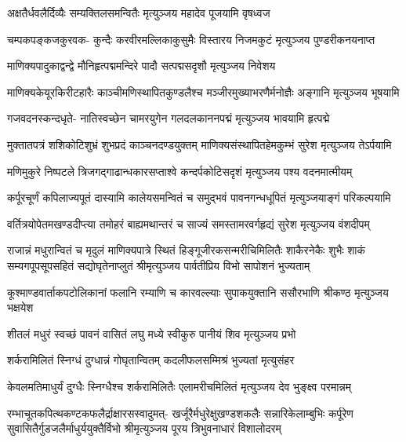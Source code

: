 \twolineshloka
{अक्षतैर्धवलैर्दिव्यैः सम्यक्तिलसमन्वितैः}
{मृत्युञ्जय महादेव पूजयामि वृषध्वज}%

\fourlineindentedshloka
{चम्पकपङ्कजकुरवक-}
{कुन्दैः करवीरमल्लिकाकुसुमैः}
{विस्तारय निजमकुटं}
{मृत्युञ्जय पुण्डरीकनयनाप्त}%

\twolineshloka
{माणिक्यपादुकाद्वन्द्वे मौनिहृत्पद्ममन्दिरे}
{पादौ सत्पद्मसदृशौ मृत्युञ्जय निवेशय}%

\fourlineindentedshloka
{माणिक्यकेयूरकिरीटहारैः}
{काञ्चीमणिस्थापितकुण्डलैश्च}
{मञ्जीरमुख्याभरणैर्मनोज्ञैः}
{अङ्गानि मृत्युञ्जय भूषयामि}%

\fourlineindentedshloka
{गजवदनस्कन्दधृते-}
{नातिस्वच्छेन चामरयुगेन}
{गलदलकाननपद्मं}
{मृत्युञ्जय भावयामि हृत्पद्मे}%

\fourlineindentedshloka
{मुक्तातपत्रं शशिकोटिशुभ्रं}
{शुभप्रदं काञ्चनदण्डयुक्तम्}
{माणिक्यसंस्थापितहेमकुम्भं}
{सुरेश मृत्युञ्जय तेऽर्पयामि}%

\fourlineindentedshloka
{मणिमुकुरे निष्पटले}
{त्रिजगद्गाढान्धकारसप्ताश्वे}
{कन्दर्पकोटिसदृशं}
{मृत्युञ्जय पश्य वदनमात्मीयम्}%

\fourlineindentedshloka
{कर्पूरचूर्णं कपिलाज्यपूतं}
{दास्यामि कालेयसमन्वितं च}
{समुद्भवं पावनगन्धधूपितं}
{मृत्युञ्जयाङ्गं परिकल्पयामि}%

\fourlineindentedshloka
{वर्तित्रयोपेतमखण्डदीप्त्या}
{तमोहरं बाह्यमथान्तरं च}
{साज्यं समस्तामरवर्गहृद्यं}
{सुरेश मृत्युञ्जय वंशदीपम्}%

\fourlineindentedshloka
{राजान्नं मधुरान्वितं च मृदुलं माणिक्यपात्रे स्थितं}
{हिङ्गूजीरकसन्मरीचिमिलितैः शाकैरनेकैः शुभैः}
{शाकं सम्यगपूपसूपसहितं सद्योघृतेनाप्लुतं}
{श्रीमृत्युञ्जय पार्वतीप्रिय विभो सापोशनं भुज्यताम्}%

\fourlineindentedshloka
{कूश्माण्डवार्ताकपटोलिकानां}
{फलानि रम्याणि च कारवल्ल्याः}
{सुपाकयुक्तानि ससौरभाणि}
{श्रीकण्ठ मृत्युञ्जय भक्षयेश}%

\twolineshloka
{शीतलं मधुरं स्वच्छं पावनं वासितं लघु}
{मध्ये स्वीकुरु पानीयं शिव मृत्युञ्जय प्रभो}%

\twolineshloka
{शर्करामिलितं स्निग्धं दुग्धान्नं गोघृतान्वितम्}
{कदलीफलसम्मिश्रं भुज्यतां मृत्युसंहर}%

\fourlineindentedshloka
{केवलमतिमाधुर्यं}
{दुग्धैः स्निग्धैश्च शर्करामिलितैः}
{एलामरीचमिलितं}
{मृत्युञ्जय देव भुङ्क्ष्व परमान्नम्}%

\fourlineindentedshloka
{रम्भाचूतकपित्थकण्टकफलैर्द्राक्षारसस्वादुमत्-}
{खर्जूरैर्मधुरेक्षुखण्डशकलैः सन्नारिकेलाम्बुभिः}
{कर्पूरेण सुवासितैर्गुडजलैर्माधुर्ययुक्तैर्विभो}
{श्रीमृत्युञ्जय पूरय त्रिभुवनाधारं विशालोदरम्}%

